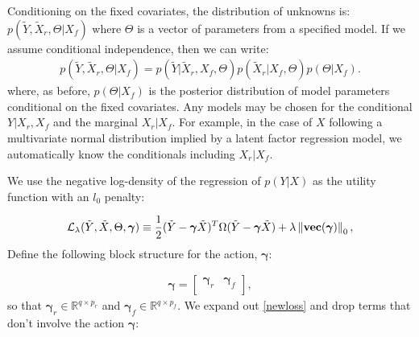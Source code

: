 \documentclass[ba]{imsart}
\newcommand\norm[1]{\left\lVert#1\right\rVert}
\begin{document}
Conditioning on the fixed covariates, the distribution of unknowns is: $p(\tilde{Y}, \tilde{X}_{r}, \Theta \vert X_{f})$ where $\Theta$ is a vector of parameters from a specified model.  If we assume conditional independence, then we can write: 
\begin{equation}
	\begin{split}
		p(\tilde{Y}, \tilde{X}_{r}, \Theta \vert X_{f}) = p(\tilde{Y} \vert \tilde{X}_{r}, X_{f}, \Theta)p(\tilde{X}_{r} \vert X_{f}, \Theta)p(\Theta \vert X_{f})	.	
	\end{split}
\end{equation}where, as before, $p(\Theta \vert X_{f})$ is the posterior distribution of model parameters conditional on the fixed covariates.  Any models may be chosen for the conditional $Y \vert X_{r}, X_{f}$ and the marginal $X_{r} \vert X_{f}$.  For example, in the case of $X$ following a multivariate normal distribution implied by a latent factor regression model, we automatically know the conditionals including $X_{r} \vert X_{f}$. 

We use the negative log-density of the regression of $p(Y\vert X)$ as the utility function with an $l_{0}$ penalty:

\begin{equation}
	\begin{split}
		\mathcal{L}_{\lambda}(\tilde{Y},\tilde{X},\Theta,\boldsymbol{\gamma}) \equiv \frac{1}{2}( \tilde{Y} - \boldsymbol{\gamma}\tilde{X} )^{T} \Omega ( \tilde{Y} - \boldsymbol{\gamma}\tilde{X} )  + \lambda \norm{\text{{\bf vec}}(\boldsymbol{\gamma})}_{0}, \label{newloss}
	\end{split}
\end{equation}
Define the following block structure for the action, $\boldsymbol{\gamma}$:

\begin{equation}
	\begin{split}
		\boldsymbol{\gamma} = \begin{bmatrix}
			\boldsymbol{\gamma}_{r} & \boldsymbol{\gamma}_{f} \\ 
		\end{bmatrix},
	\end{split}
\end{equation}so that $\boldsymbol{\gamma}_{r} \in \mathbb{R}^{q \times p_{r}}$ and $\boldsymbol{\gamma}_{f} \in \mathbb{R}^{q \times p_{f}}$.  We expand out \ref{newloss} and drop terms that don't involve the action $\boldsymbol{\gamma}$:
\end{document}
